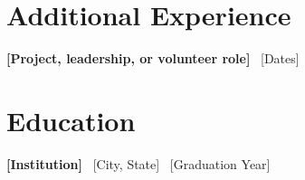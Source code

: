 \documentclass[10pt,letterpaper]{article}
\begin{document}
\section{Additional Experience}
\textbf{[Project, leadership, or volunteer role]} \textbar\ [Dates]\par
[One concise description of relevant work or contribution.]

\section{Education}
\textbf{[Institution]} \textbar\ [City, State] \textbar\ [Graduation Year]\par
[Degree, field of study, and optional relevant honors or coursework]
\end{document}

